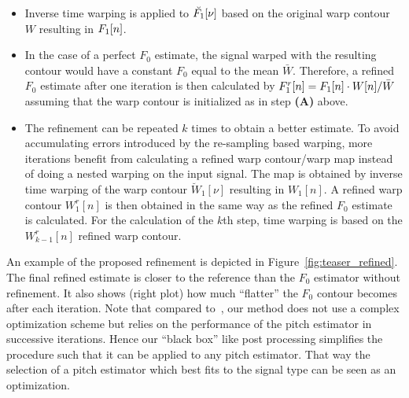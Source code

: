 \begin{itemize}
    \item Inverse time warping is applied to $\breve{{F}_1}[\nu]$ based on the original warp contour $W$ resulting in ${F}_1[n]$.
    \item In the case of a perfect $F_0$ estimate, the signal warped with the resulting contour would have a constant $F_0$ equal to the mean $\bar{W}$. Therefore, a refined $F_0$ estimate after one iteration is then calculated by ${F}_1^r[n] = {F}_1[n] \cdot W[n] / \bar{W}$ assuming that the warp contour is initialized as in step \textbf{(A)} above. 
    \item The refinement can be repeated $k$ times to obtain a better estimate. To avoid accumulating errors introduced by the re-sampling based warping, more iterations benefit from calculating a refined warp contour/warp map instead of doing a nested warping on the input signal. The map is obtained by inverse time warping of the warp contour $\breve{W}_1[\nu]$ resulting in $W_1[n]$. A refined warp contour $W_1^r[n]$ is then obtained in the same way as the refined $F_0$ estimate is calculated. For the calculation of the $k$th step, time warping is based on the $W_{k-1}^r[n]$ refined warp contour.
\end{itemize}
An example of the proposed refinement is depicted in Figure~\ref{fig:teaser_refined}. The final refined estimate is closer to the reference than the $F_0$ estimator without refinement. It also shows (right plot) how much ``flatter'' the $F_0$ contour becomes after each iteration.
Note that compared to~\cite{resch07}, our method does not use a complex optimization scheme but relies on the performance of the pitch estimator in successive iterations. Hence our ``black box'' like post processing simplifies the procedure such that it can be applied to any pitch estimator. That way the selection of a pitch estimator which best fits to the signal type can be seen as an optimization.

